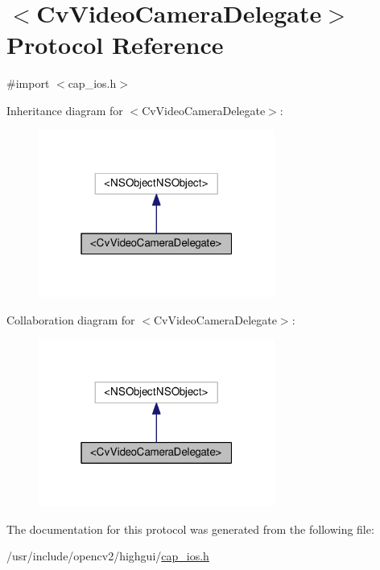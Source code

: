 \hypertarget{protocolCvVideoCameraDelegate-p}{\section{$<$Cv\-Video\-Camera\-Delegate$>$ Protocol Reference}
\label{protocolCvVideoCameraDelegate-p}
}


{\ttfamily \#import $<$cap\-\_\-ios.\-h$>$}



Inheritance diagram for $<$Cv\-Video\-Camera\-Delegate$>$\-:\nopagebreak
\begin{figure}[H]
\begin{center}
\leavevmode
\includegraphics[width=220pt]{protocolCvVideoCameraDelegate-p__inherit__graph}
\end{center}
\end{figure}


Collaboration diagram for $<$Cv\-Video\-Camera\-Delegate$>$\-:\nopagebreak
\begin{figure}[H]
\begin{center}
\leavevmode
\includegraphics[width=220pt]{protocolCvVideoCameraDelegate-p__coll__graph}
\end{center}
\end{figure}


The documentation for this protocol was generated from the following file\-:\begin{DoxyCompactItemize}
\item 
/usr/include/opencv2/highgui/\hyperlink{cap__ios_8h}{cap\-\_\-ios.\-h}\end{DoxyCompactItemize}
